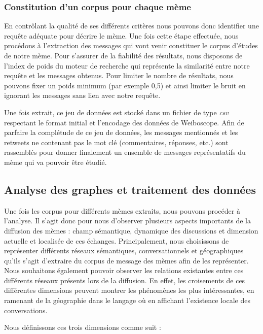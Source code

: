 \subsubsection[Constitution d'un corpus pour chaque mème]{Constitution d'un corpus pour chaque mème}

    En contrôlant la qualité de ses différents critères nous pouvons donc identifier une requête adéquate pour décrire le mème. Une fois cette étape effectuée, nous procédons à l'extraction des messages qui vont venir constituer le corpus d'études de notre mème. Pour s'assurer de la fiabilité des résultats, nous disposons de l'index de poids du moteur de recherche qui représente la similarité entre notre requête et les messages obtenus. Pour limiter le nombre de résultats, nous pouvons fixer un poids minimum (par exemple 0,5) et ainsi limiter le bruit en ignorant les messages sans lien avec notre requête.

    Une fois extrait, ce jeu de données est stocké dans un fichier de type  \textit{csv} respectant le format initial et l'encodage des données de Weiboscope. Afin de parfaire la complétude de ce jeu de données, les messages mentionnés et les retweets ne contenant pas le mot clé (commentaires, réponses, etc.) sont rassemblés pour donner finalement un ensemble de messages représentatifs du mème qui va pouvoir être étudié.


\subsection[Analyse des graphes et traitement des données]{Analyse des graphes et traitement des données}

    Une fois les corpus pour différents mèmes extraits, nous pouvons procéder à l'analyse. Il s'agit donc pour nous d'observer plusieurs aspects importants de la diffusion des mèmes : champ sémantique, dynamique des discussions et dimension actuelle et localisée de ces échanges. Principalement, nous choisissons de représenter différents réseaux sémantiques, conversationnels et géographiques qu'ils s'agit d'extraire du corpus de message des mèmes afin de les représenter. Nous souhaitons également  pouvoir observer les relations existantes entre ces différents réseaux présents lors de la diffusion. En effet, les croisements de ces différentes dimensions peuvent montrer les phénomènes les plus intéressantes, en ramenant de la géographie dans le langage où en affichant l'existence locale des conversations.

    Nous définissons ces trois dimensions comme suit :

